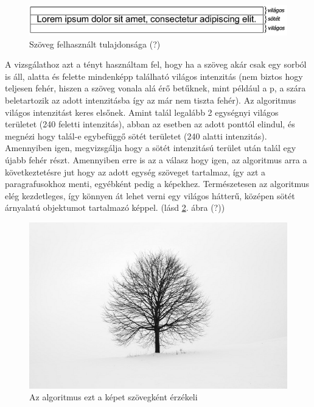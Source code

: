 \begin{figure}[H]
\centering
\includegraphics[scale=1]{images/line.png}
\caption{Szöveg felhasznált tulajdonsága (?)}
\label{fig:line}
\end{figure}

A vizsgálathoz azt a tényt használtam fel, hogy ha a szöveg akár csak egy sorból is áll, alatta és felette mindenképp található világos intenzitás (nem biztos hogy teljesen fehér, hiszen a szöveg vonala alá érő betűknek, mint például a p, a szára beletartozik az adott intenzitásba így az már nem tiszta fehér). Az algoritmus világos intenzitást keres elsőnek. Amint talál legalább 2 egységnyi világos területet (240 feletti intenzitás), abban az esetben az adott ponttól elindul, és megnézi hogy talál-e egybefüggő sötét területet (240 alatti intenzitás). Amennyiben igen, megvizsgálja hogy a sötét intenzitású terület után talál egy újabb fehér részt. Amennyiben erre is az a válasz hogy igen, az algoritmus arra a következtetésre jut hogy az adott egység szöveget tartalmaz, így azt a paragrafusokhoz menti, egyébként pedig a képekhez. Természetesen az algoritmus elég kezdetleges, így könnyen át lehet verni egy világos hátterű, középen sötét árnyalatú objektumot tartalmazó képpel. (lásd \ref{fig:tree}. ábra (?))

\begin{figure}[H]
\centering
\includegraphics[scale=1]{images/tree.png}
\caption{Az algoritmus ezt a képet szövegként érzékeli}
\label{fig:tree}
\end{figure}

